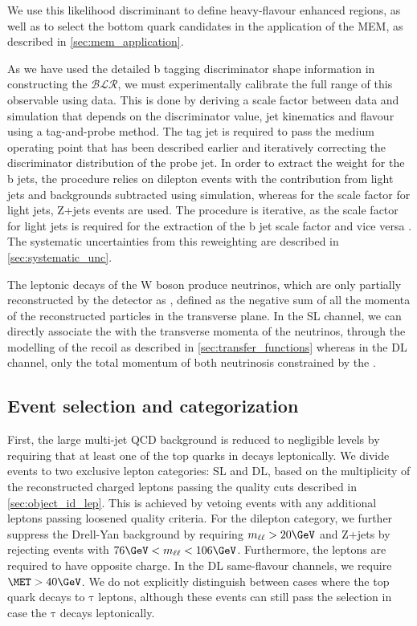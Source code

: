 We use this likelihood discriminant to define heavy-flavour enhanced regions, as well as to select the bottom quark candidates in the application of the MEM, as described in \cref{sec:mem_application}. 

As we have used the detailed b tagging discriminator shape information in constructing the $\mathcal{BLR}$, we must experimentally calibrate the full range of this observable using data. This is done by deriving a scale factor between data and simulation that depends on the discriminator value, jet kinematics and flavour using a tag-and-probe method. The tag jet is required to pass the medium operating point that has been described earlier and iteratively correcting the discriminator distribution of the probe jet. In order to extract the weight for the b jets, the procedure relies on dilepton \ttbar events with the contribution from light jets and backgrounds subtracted using simulation, whereas for the scale factor for light jets, Z+jets events are used. The procedure is iterative, as the scale factor for light jets is required for the extraction of the b jet scale factor and vice versa \cite{CMS:2013sea,CMS-PAS-BTV-15-001}. The systematic uncertainties from this reweighting are described in \cref{sec:systematic_unc}.

The leptonic decays of the W boson produce neutrinos, which are only partially reconstructed by the detector as \MET, defined as the negative sum of all the momenta of the reconstructed particles in the transverse plane. In the SL channel, we can directly associate the \MET with the transverse momenta of the neutrinos, through the modelling of the recoil as described in \cref{sec:transfer_functions} whereas in the DL channel, only the total momentum of both neutrinosis  constrained by the \MET.

\subsection{Event selection and categorization}
\label{sec:event_selection}

First, the large multi-jet QCD background is reduced to negligible levels by requiring that at least one of the top quarks in \ttHbb decays leptonically. We divide events to two exclusive lepton categories: SL and DL, based on the multiplicity of the reconstructed charged leptons passing the quality cuts described in \cref{sec:object_id_lep}. This is achieved by vetoing events with any additional leptons passing loosened quality criteria. For the dilepton category, we further suppress the Drell-Yan background by requiring $m_{\ell\ell} > 20\GeV$ and Z+jets by rejecting events with $76\GeV < m_{\ell\ell} < 106\GeV$. Furthermore, the leptons are required to have opposite charge. In the DL same-flavour channels, we require $\MET > 40\GeV$. We do not explicitly distinguish between cases where the top quark decays to $\mathrm{\tau}$ leptons, although these events can still pass the selection in case the $\mathrm{\tau}$ decays leptonically.

